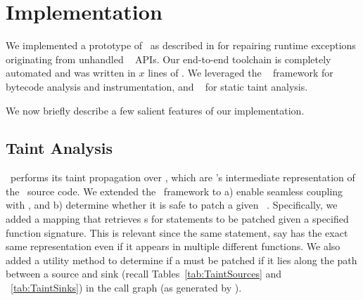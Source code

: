 \section{Implementation}
\label{sec:implementation}

We implemented a prototype of \tool\ as described in  for
repairing runtime exceptions originating from unhandled \java\ 
APIs. Our end-to-end toolchain is completely automated and was written in $x$
lines of \java. We leveraged the \soot~\cite{soot} framework for bytecode
analysis and instrumentation, and \infoflow~\cite{infoflow} for static taint
analysis.


We now briefly describe a few salient features of our implementation.

\subsection{Taint Analysis}

\infoflow\ performs its taint propagation over , which are \soot's
intermediate representation of the \java\ source code. We extended the
\infoflow\ framework to a) enable seamless coupling with \soot, and b) determine
whether it is safe to patch a given \soot\ . Specifically, we added
a mapping that retrieves s for statements to be patched given a
specified function signature. This is relevant since the same statement, say
 has the exact same representation even if it appears in
multiple different functions. We also added a utility method to determine if a
 must be patched if it lies along the path between a source and sink
(recall Tables~\ref{tab:TaintSources} and ~\ref{tab:TaintSinks}) in the call
graph (as generated by \soot).


